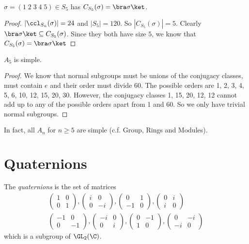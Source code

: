 \documentclass[a4pape]{article}
\begin{document}
\begin{lemma}
  $\sigma = (1\; 2\; 3\; 4\; 5)\in S_5$ has $C_{S_5}(\sigma) = \bra \sigma \ket$. \end{lemma}

\begin{proof}
  $|\ccl_{S_n}(\sigma)| = 24$ and $|S_5| = 120$. So $|C_{S_5}(\sigma)| = 5$. Clearly $\bra \sigma \ket \subseteq C_{S_5}(\sigma)$. Since they both have size $5$, we know that $C_{S_5}(\sigma) = \bra \sigma\ket$
\end{proof}

\begin{thm}
  $A_5$ is simple.
\end{thm}

\begin{proof}
  We know that normal subgroups must be unions of the conjugacy classes, must contain $e$ and their order must divide 60. The possible orders are 1, 2, 3, 4, 5, 6, 10, 12, 15, 20, 30. However, the conjugacy classes 1, 15, 20, 12, 12 cannot add up to any of the possible orders apart from 1 and 60. So we only have trivial normal subgroups.
\end{proof}
In fact, all $A_n$ for $n\geq 5$ are simple (c.f. Group, Rings and Modules).

\section{Quaternions}
\begin{defi}[Quaternions]
  The \emph{quaternions} is the set of matrices
  \begin{gather*}
  \begin{pmatrix}
    1&0\\0&1
  \end{pmatrix}, 
  \begin{pmatrix}
    i & 0\\0&-i
  \end{pmatrix},
  \begin{pmatrix}
    0&1\\-1&0
  \end{pmatrix},
  \begin{pmatrix}
    0&i\\i&0
  \end{pmatrix}
  \\
  \begin{pmatrix}
      -1&0\\0&-1
    \end{pmatrix}, 
    \begin{pmatrix}
      -i & 0\\0&i
    \end{pmatrix},
    \begin{pmatrix}
      0&-1\\1&0
    \end{pmatrix},
    \begin{pmatrix}
      0&-i\\-i&0
    \end{pmatrix}
  \end{gather*}
    which is a subgroup of $\GL_2(\C)$.
\end{defi}
\end{document}
